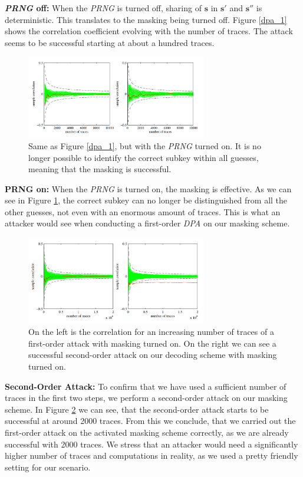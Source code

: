 \textbf{\textit{\acs{PRNG}} off:} When the \textit{\ac{PRNG}} is turned off, sharing of \(\textbf{s}\) in \(\textbf{s}'\) and \(\textbf{s}''\) is deterministic. This translates to the masking being turned off. Figure \ref{dpa_1} shows the correlation coefficient evolving with the number of traces. The attack seems to be successful starting at about a hundred traces.
\begin{figure}[H]
	\centering
	\includegraphics[width=0.7\textwidth]{dpa_2.png}
	\caption{Same as Figure \ref{dpa_1}, but with the \textit{\acs{PRNG}} turned on. It is no longer possible to identify the correct subkey within all guesses, meaning that the masking is successful. \cite{maskedRing}}
	\label{dpa_2}
\end{figure}

\textbf{\acs{PRNG} on:} When the \textit{\acs{PRNG}} is turned on, the masking is effective. As we can see in Figure \ref{dpa_2}, the correct subkey can no longer be distinguished from all the other guesses, not even with an enormous amount of traces. This is what an attacker would see when conducting a first-order \textit{\ac{DPA}} on our masking scheme.
\begin{figure}[H]
	\centering
	\includegraphics[width=0.7\textwidth]{dpa_3.png}
	\caption{On the left is the correlation for an increasing number of traces of a first-order attack with masking turned on. On the right we can see a successful second-order attack on our decoding scheme with masking turned on. \cite{maskedRing}}
	\label{dpa_3}
\end{figure}

\textbf{Second-Order Attack:} To confirm that we have used a sufficient number of traces in the first two steps, we perform a second-order attack on our masking scheme. In Figure \ref{dpa_3} we can see, that the second-order attack starts to be successful at around 2000 traces. From this we conclude, that we carried out the first-order attack on the activated masking scheme correctly, as we are already successful with 2000 traces. We stress that an attacker would need a significantly higher number of traces and computations in reality, as we used a pretty friendly setting for our scenario.